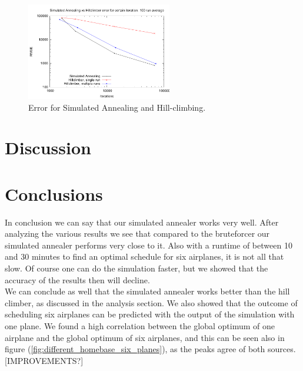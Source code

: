 \documentclass[journal]{IEEEtran}
\begin{document}
\begin{figure}[H]
\centering
\includegraphics[width=2.5in]{iterations_vs_error_sa_hc}
\caption{Error for Simulated Annealing and Hill-climbing.\tiny}
\label{fig:error_sa_hc}
\end{figure}

\section{Discussion}






\section{Conclusions}
In conclusion we can say that our simulated annealer works very well. After analyzing the various results we see that compared to the bruteforcer our simulated annealer performs very close to it. Also with a runtime of between 10 and 30 minutes to find an optimal schedule for six airplanes, it is not all that slow. Of course one can do the simulation faster, but we showed that the accuracy of the results then will decline.\\ 
We can conclude as well that the simulated annealer works better than the hill climber, as discussed in the analysis section.
We also showed that the outcome of scheduling six airplanes can be predicted with the output of the simulation with one plane. We found a high correlation between the global optimum of one airplane and the global optimum of six airplanes, and this can be seen also in figure (\ref{fig:different_homebase_six_planes}), as the peaks agree of both sources. [IMPROVEMENTS?]\\



\end{document}
